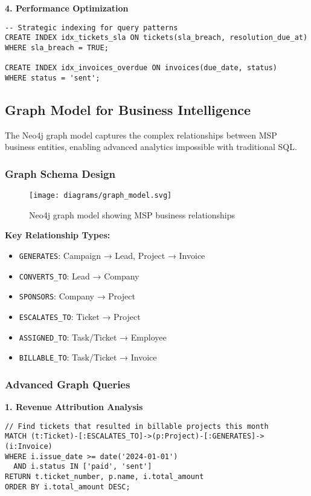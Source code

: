 \textbf{4. Performance Optimization}
\begin{verbatim}
-- Strategic indexing for query patterns
CREATE INDEX idx_tickets_sla ON tickets(sla_breach, resolution_due_at) 
WHERE sla_breach = TRUE;

CREATE INDEX idx_invoices_overdue ON invoices(due_date, status) 
WHERE status = 'sent';
\end{verbatim}

\subsection{Graph Model for Business Intelligence}

The Neo4j graph model captures the complex relationships between MSP business entities, enabling advanced analytics impossible with traditional SQL.

\subsubsection{Graph Schema Design}

\begin{figure}[h]
  \centering
  \texttt{[image: diagrams/graph\_model.svg]}
  \caption{Neo4j graph model showing MSP business relationships}
\end{figure}

\textbf{Key Relationship Types:}
\begin{itemize}
  \item \texttt{GENERATES}: Campaign → Lead, Project → Invoice
  \item \texttt{CONVERTS\_TO}: Lead → Company
  \item \texttt{SPONSORS}: Company → Project
  \item \texttt{ESCALATES\_TO}: Ticket → Project
  \item \texttt{ASSIGNED\_TO}: Task/Ticket → Employee
  \item \texttt{BILLABLE\_TO}: Task/Ticket → Invoice
\end{itemize}

\subsubsection{Advanced Graph Queries}

\textbf{1. Revenue Attribution Analysis}
\begin{verbatim}
// Find tickets that resulted in billable projects this month
MATCH (t:Ticket)-[:ESCALATES_TO]->(p:Project)-[:GENERATES]->(i:Invoice)
WHERE i.issue_date >= date('2024-01-01') 
  AND i.status IN ['paid', 'sent']
RETURN t.ticket_number, p.name, i.total_amount
ORDER BY i.total_amount DESC;
\end{verbatim}

